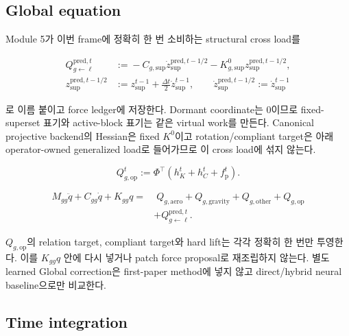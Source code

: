 \documentclass[11pt,a4paper]{article}
\begin{document}
\subsection*{Global equation}

Module 5가 이번 frame에 정확히 한 번 소비하는 structural cross load를

\begin{equation}
\begin{aligned}
  Q_{g\leftarrow\ell}^{\mathrm{pred},t}
  &:={}
  -C_{g,\mathrm{sup}}\dot z_{\mathrm{sup}}^{\mathrm{pred},t-1/2}
  -K_{g,\mathrm{sup}}^{0}z_{\mathrm{sup}}^{\mathrm{pred},t-1/2},\\
  z_{\mathrm{sup}}^{\mathrm{pred},t-1/2}
  &:={}
  z_{\mathrm{sup}}^{t-1}
  +\frac{\Delta t}{2}\dot z_{\mathrm{sup}}^{t-1},
  \qquad
  \dot z_{\mathrm{sup}}^{\mathrm{pred},t-1/2}
  :=\dot z_{\mathrm{sup}}^{t-1}
\end{aligned}
  \label{eq:predictor-cross-load}
\end{equation}

로 이름 붙이고 force ledger에 저장한다. Dormant coordinate는 0이므로
fixed-superset 표기와 active-block 표기는 같은 virtual work를 만든다.
Canonical projective backend의 Hessian은 fixed \(K^0\)이고 rotation/compliant target은
아래 operator-owned generalized load로 들어가므로 이 cross load에 섞지 않는다.

\begin{equation}
  Q_{g,\mathrm{op}}^t
  :=\Phi^\top(h_K^t+h_C^t+f_{\mathrm p}^t).
  \label{eq:global-operator-target-load}
\end{equation}

\begin{equation}
\begin{aligned}
  M_{gg}\ddot q
  +C_{gg}\dot q
  +K_{gg}q
  =&\;
  Q_{g,\mathrm{aero}}
  +Q_{g,\mathrm{gravity}}
  +Q_{g,\mathrm{other}}
  +Q_{g,\mathrm{op}}\\
  &+Q_{g\leftarrow\ell}^{\mathrm{pred},t}.
  \label{eq:global-dynamics}
\end{aligned}
\end{equation}

\(Q_{g,\mathrm{op}}\)의 relation target, compliant target와 hard lift는
각각 정확히 한 번만 투영한다. 이를 \(K_{gg}q\) 안에 다시 넣거나
patch force proposal로 재조립하지 않는다.
별도 learned Global correction은 first-paper method에 넣지 않고 direct/hybrid neural baseline으로만 비교한다.

\subsection*{Time integration}
\end{document}
